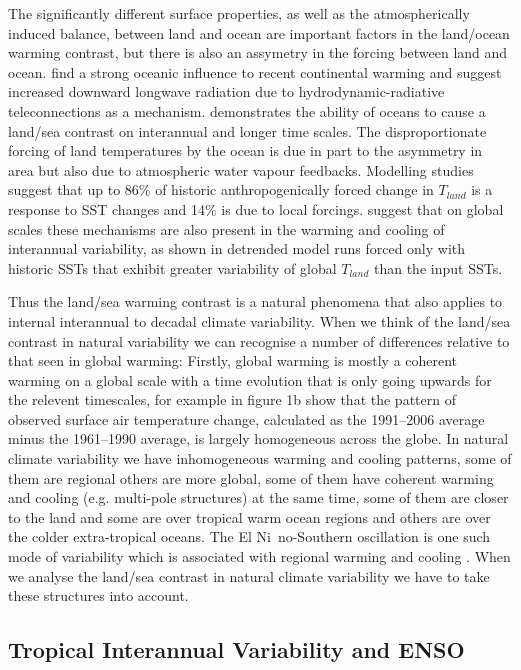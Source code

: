 The significantly different surface properties, as well as the atmospherically 
induced balance, between land and ocean are important factors in the land/ocean 
warming contrast, but there is also an assymetry in the forcing between land and 
ocean.  \citet{Compo2008} find a strong oceanic influence to recent continental 
warming and suggest increased downward longwave radiation due to 
hydrodynamic-radiative teleconnections as a mechanism.  \citet{Dommenget2009} 
demonstrates the ability of oceans to cause a land/sea contrast on interannual 
and longer time scales.  The disproportionate forcing of land temperatures by 
the ocean is due in part to the asymmetry in area but also due to atmospheric 
water vapour feedbacks.  Modelling studies suggest that up to 86\% of historic 
anthropogenically forced change in $T_{land}$ is a response to SST changes and 
14\% is due to local forcings. \citet{Dommenget2009} suggest that on global 
scales these mechanisms are also present in the warming and cooling of 
interannual variability, as shown in detrended model runs forced only with 
historic SSTs that exhibit greater variability of global $T_{land}$ than the 
input SSTs.

Thus the land/sea warming contrast is a natural phenomena that also applies to 
internal interannual to decadal climate variability.  When we think of the 
land/sea contrast in natural variability we can recognise a number of 
differences relative to that seen in global warming: Firstly, global warming is 
mostly a coherent warming on a global scale with a time evolution that is only 
going upwards for the relevent timescales, for example \citet{Compo2008} in 
figure 1b show that the pattern of observed surface air temperature change, 
calculated as the 1991--2006 average minus the 1961--1990 average, is largely 
homogeneous across the globe. In natural climate variability we have 
inhomogeneous warming and cooling patterns, some of them are regional others are 
more global, some of them have coherent warming and cooling (e.g.  multi-pole 
structures) at the same time, some of them are closer to the land and some are 
over tropical warm ocean regions and others are over the colder extra-tropical 
oceans. The El Ni{~n}o-Southern oscillation is one such mode of variability which 
is associated with regional warming and cooling \citep{Halpert1992}. When we 
analyse the land/sea contrast in natural climate variability we have to take 
these structures into account.

\subsection{Tropical Interannual Variability and ENSO}

